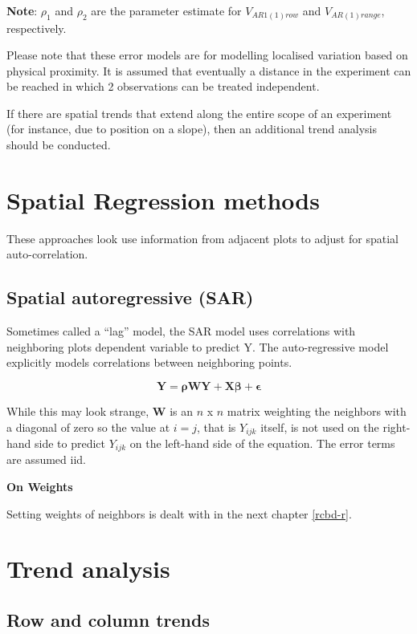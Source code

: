 \documentclass[
]{book}
\begin{document}
\textbf{Note}: \(\rho_1\) and \(\rho_2\) are the parameter estimate for \(V_{AR1(1) row}\) and \(V_{AR(1)range}\), respectively.

Please note that these error models are for modelling localised variation based on physical proximity. It is assumed that eventually a distance in the experiment can be reached in which 2 observations can be treated independent.

If there are spatial trends that extend along the entire scope of an experiment (for instance, due to position on a slope), then an additional trend analysis should be conducted.

\hypertarget{spatial-regression-methods}{%
\section{Spatial Regression methods}\label{spatial-regression-methods}}

These approaches look use information from adjacent plots to adjust for spatial auto-correlation.

\hypertarget{spatial-autoregressive-sar}{%
\subsection{Spatial autoregressive (SAR)}\label{spatial-autoregressive-sar}}

Sometimes called a ``lag'' model, the SAR model uses correlations with neighboring plots dependent variable to predict Y. The auto-regressive model explicitly models correlations between neighboring points.

\[\mathbf{Y =  \rho W Y + X\beta + \epsilon} \]

While this may look strange, \(\mathbf{W}\) is an \(n\) x \(n\) matrix weighting the neighbors with a diagonal of zero so the value at \(i=j\), that is \(Y_{ijk}\) itself, is not used on the right-hand side to predict \(Y_{ijk}\) on the left-hand side of the equation. The error terms are assumed iid.

\textbf{On Weights}

Setting weights of neighbors is dealt with in the next chapter \ref{rcbd-r}.

\hypertarget{trend-analysis}{%
\section{Trend analysis}\label{trend-analysis}}

\hypertarget{row-and-column-trends}{%
\subsection{Row and column trends}\label{row-and-column-trends}}
\end{document}
